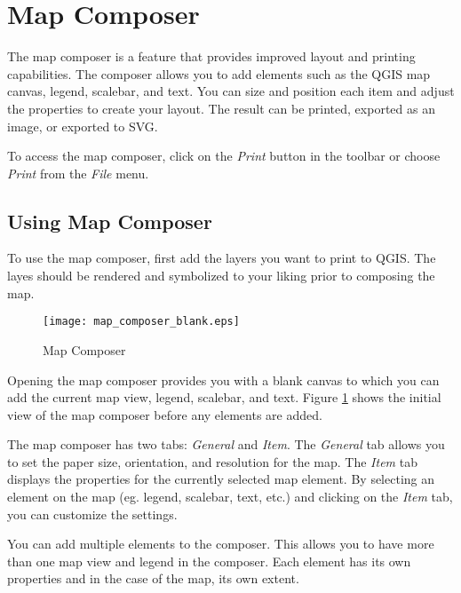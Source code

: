 
\section{Map Composer}\label{label_mapcomposer}

The map composer is a feature that provides improved layout and printing
capabilities. The composer allows you to add elements such as the QGIS map
canvas, legend, scalebar, and text. You can size and position each item and
adjust the properties to create your layout. The result can be printed,
exported as an image, or exported to SVG.

To access the map composer, click on the \textit{Print} button in the toolbar
or choose \textit{Print} from the \textit{File} menu.

\subsection{Using Map Composer}\label{label_usemapcomposer} 

To use the map composer, first add the layers you
want to print to QGIS. The layes should be rendered and symbolized to your
liking prior to composing the map. 

\begin{figure}[ht]
   \begin{center}
   \caption{Map Composer}\label{fig:map_composer_blank}\smallskip
   \texttt{[image: map\_composer\_blank.eps]}
\end{center}  
\end{figure}

Opening the map composer provides you with a blank canvas to which you can add
the current map view, legend, scalebar, and text. Figure
\ref{fig:map_composer_blank} shows the initial view of the map composer before
any elements are added.

The map composer has two tabs: \textit{General} and \textit{Item}. The
\textit{General} tab allows you to set the paper size, orientation, and
resolution for the map. The \textit{Item} tab displays the properties for the
currently selected map element. By selecting an element on the map (eg.
legend, scalebar, text, etc.) and clicking on the \textit{Item} tab, you can
customize the settings.

You can add multiple elements to the composer. This allows you to have more
than one map view and legend in the composer. Each element has its own
properties and in the case of the map, its own extent.

